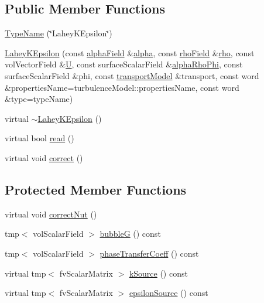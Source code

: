 \subsection*{Public Member Functions}
\begin{DoxyCompactItemize}
\item 
\hyperlink{classFoam_1_1RASModels_1_1LaheyKEpsilon_aea25e8918997a469bfd8a84653cb6642}{Type\+Name} (\char`\"{}Lahey\+K\+Epsilon\char`\"{})
\item 
\hyperlink{classFoam_1_1RASModels_1_1LaheyKEpsilon_ae43b52b43c896333a5c79a567c48ed42}{Lahey\+K\+Epsilon} (const \hyperlink{classFoam_1_1RASModels_1_1LaheyKEpsilon_a06a66094f33d6817d19225445c5ea874}{alpha\+Field} \&\hyperlink{UEqn__1pl_8H_a7fe02434a19f3e00e927f32adcbb193b}{alpha}, const \hyperlink{classFoam_1_1RASModels_1_1LaheyKEpsilon_a1dda906cfc9022335f0782a632302cd8}{rho\+Field} \&\hyperlink{EEqn__1pl_8H_ac955f87ac2b79f02f420cae087fc52b1}{rho}, const vol\+Vector\+Field \&\hyperlink{UEqn__1pl_8H_abe23fa3afe09cc511569a7dca4160561}{U}, const surface\+Scalar\+Field \&\hyperlink{updateAlphaPhiAndInitControls__1p_8H_adb16eab5a684ddb62e40a6ffdc2d646c}{alpha\+Rho\+Phi}, const surface\+Scalar\+Field \&phi, const \hyperlink{classFoam_1_1RASModels_1_1LaheyKEpsilon_ac0a5dc3c45a2d1c61a649bc435a1a48a}{transport\+Model} \&transport, const word \&properties\+Name=turbulence\+Model\+::properties\+Name, const word \&type=type\+Name)
\item 
virtual \hyperlink{classFoam_1_1RASModels_1_1LaheyKEpsilon_ac5a2f078aa51cf8f66e1f7d577e08373}{$\sim$\+Lahey\+K\+Epsilon} ()
\item 
virtual bool \hyperlink{classFoam_1_1RASModels_1_1LaheyKEpsilon_af816873151ddb0126e98bb2f914d8ed5}{read} ()
\item 
virtual void \hyperlink{classFoam_1_1RASModels_1_1LaheyKEpsilon_a3ae44b28050c3aa494c1d8e18cf618c1}{correct} ()
\end{DoxyCompactItemize}
\subsection*{Protected Member Functions}
\begin{DoxyCompactItemize}
\item 
virtual void \hyperlink{classFoam_1_1RASModels_1_1LaheyKEpsilon_aaffe89433f18f1ee4137486e19219448}{correct\+Nut} ()
\item 
tmp$<$ vol\+Scalar\+Field $>$ \hyperlink{classFoam_1_1RASModels_1_1LaheyKEpsilon_a627e30c80dd2737d19b4c4163b766488}{bubbleG} () const
\item 
tmp$<$ vol\+Scalar\+Field $>$ \hyperlink{classFoam_1_1RASModels_1_1LaheyKEpsilon_a77730349d149826f1f8dd7b9b67bb169}{phase\+Transfer\+Coeff} () const
\item 
virtual tmp$<$ fv\+Scalar\+Matrix $>$ \hyperlink{classFoam_1_1RASModels_1_1LaheyKEpsilon_abd7aa1bd65c38f9773745c8d98a2fed0}{k\+Source} () const
\item 
virtual tmp$<$ fv\+Scalar\+Matrix $>$ \hyperlink{classFoam_1_1RASModels_1_1LaheyKEpsilon_a11abcc44df285cf748c77aa0a7cac6b8}{epsilon\+Source} () const
\end{DoxyCompactItemize}
